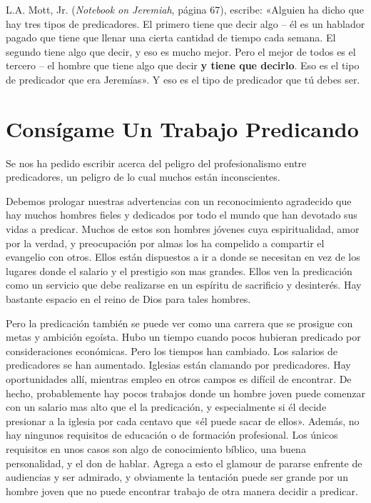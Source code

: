 \documentclass[12pt, twoside, openright]{book}
\begin{document}
L.A. Mott, Jr. (\textit{Notebook on Jeremiah}, página 67), escribe: «Alguien ha dicho que hay tres tipos de predicadores. El primero tiene que decir algo – él es un hablador pagado que tiene que llenar una cierta cantidad de tiempo cada semana. El segundo tiene algo que decir, y eso es mucho mejor. Pero el mejor de todos es el tercero – el hombre que tiene algo que decir \textbf{y tiene que decirlo}. Eso es el tipo de predicador que era Jeremías». Y eso es el tipo de predicador que tú debes ser.

\section{Consígame Un Trabajo Predicando}
Se nos ha pedido escribir acerca del peligro del profesionalismo entre predicadores, un peligro de lo cual muchos están inconscientes. 

Debemos prologar nuestras advertencias con un reconocimiento agradecido que hay muchos hombres fieles y dedicados por todo el mundo que han devotado sus vidas a predicar. Muchos de estos son hombres jóvenes cuya espiritualidad, amor por la verdad, y preocupación por almas los ha compelido a compartir el evangelio con otros. Ellos están dispuestos a ir a donde se necesitan en vez de los lugares donde el salario y el prestigio son mas grandes. Ellos ven la predicación como un servicio que debe realizarse en un espíritu de sacrificio y desinterés. Hay bastante espacio en el reino de Dios para tales hombres.

Pero la predicación también se puede ver como una carrera que se prosigue con metas y ambición egoísta. Hubo un tiempo cuando pocos hubieran predicado por consideraciones económicas. Pero los tiempos han cambiado. Los salarios de predicadores se han aumentado. Iglesias están clamando por predicadores. Hay oportunidades allí, mientras empleo en otros campos es difícil de encontrar. De hecho, probablemente hay pocos trabajos donde un hombre joven puede comenzar con un salario mas alto que el la predicación, y especialmente si él decide presionar a la iglesia por cada centavo que «él puede sacar de ellos». Además, no hay ningunos requisitos de educación o de formación profesional. Los únicos requisitos en unos casos son algo de conocimiento bíblico, una buena personalidad, y el don de hablar. Agrega a esto el glamour de pararse enfrente de audiencias y ser admirado, y obviamente la tentación puede ser grande por un hombre joven que no puede encontrar trabajo de otra manera decidir a predicar. 
\end{document}
